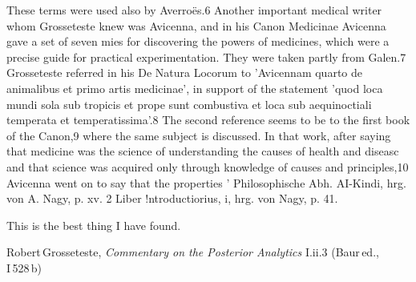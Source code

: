 These terms were used also by Averroës.6
Another important medical writer whom Grosseteste knew was
Avicenna, and in his Canon Medicinae Avicenna gave a set of seven
mies for discovering the powers of medicines, which were a precise
guide for practical experimentation. They were taken partly from
Galen.7 Grosseteste referred in his De Natura Locorum to 'Avicennam
quarto de animalibus et primo artis medicinae', in support of
the statement 'quod loca mundi sola sub tropicis et prope sunt combustiva
et loca sub aequinoctiali temperata et temperatissima'.8 The
second reference seems to be to the first book of the Canon,9 where
the same subject is discussed. In that work, after saying that
medicine was the science of understanding the causes of health and
diseasc and that science was acquired only through knowledge of
causes and principles,10 Avicenna went on to say that the properties
' Philosophische Abh. AI-Kindi, hrg. von A. Nagy, p. xv.
2 Liber !ntroductiorius, i, hrg. von Nagy, p. 41.


This is the best thing I have found. 

{\small Robert Grosseteste, \textit{Commentary on the Posterior Analytics} I.ii.3 (Baur ed., I 528 b)}

